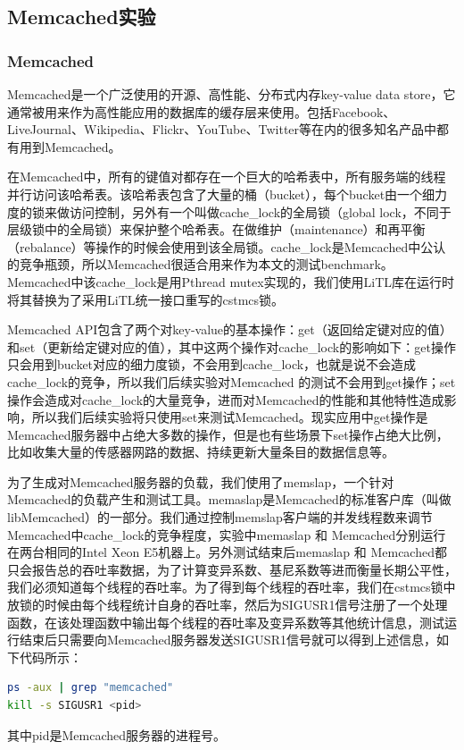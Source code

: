 \subsection{Memcached实验}
\subsubsection{Memcached}
Memcached是一个广泛使用的开源、高性能、分布式内存key-value data store，它通常被用来作为高性能应用的数据库的缓存层来使用。包括Facebook、LiveJournal、Wikipedia、Flickr、YouTube、Twitter等在内的很多知名产品中都有用到Memcached。

在Memcached中，所有的键值对都存在一个巨大的哈希表中，所有服务端的线程并行访问该哈希表。该哈希表包含了大量的桶（bucket），每个bucket由一个细力度的锁来做访问控制，另外有一个叫做cache\_lock的全局锁（global lock，不同于层级锁中的全局锁）来保护整个哈希表。在做维护（maintenance）和再平衡（rebalance）等操作的时候会使用到该全局锁。cache\_lock是Memcached中公认的竞争瓶颈\cite{pohlack2011lightweight}，所以Memcached很适合用来作为本文的测试benchmark。Memcached中该cache\_lock是用Pthread mutex实现的，我们使用LiTL库在运行时将其替换为了采用LiTL统一接口重写的cstmcs锁。

Memcached API包含了两个对key-value的基本操作：get（返回给定键对应的值）和set（更新给定键对应的值），其中这两个操作对cache\_lock的影响如下：get操作只会用到bucket对应的细力度锁，不会用到cache\_lock，也就是说不会造成cache\_lock的竞争，所以我们后续实验对Memcached 的测试不会用到get操作；set操作会造成对cache\_lock的大量竞争，进而对Memcached的性能和其他特性造成影响，所以我们后续实验将只使用set来测试Memcached。现实应用中get操作是Memcached服务器中占绝大多数的操作，但是也有些场景下set操作占绝大比例，比如收集大量的传感器网路的数据、持续更新大量条目的数据信息等\cite{dice2012lock}。

为了生成对Memcached服务器的负载，我们使用了memslap，一个针对Memcached的负载产生和测试工具。memaslap是Memcached的标准客户库（叫做libMemcached\cite{libmemcached}）的一部分。我们通过控制memslap客户端的并发线程数来调节Memcached中cache\_lock的竞争程度，实验中memaslap 和 Memcached分别运行在两台相同的Intel Xeon E5机器上。另外测试结束后memaslap 和 Memcached都只会报告总的吞吐率数据，为了计算变异系数、基尼系数等进而衡量长期公平性，我们必须知道每个线程的吞吐率。为了得到每个线程的吞吐率，我们在cstmcs锁中放锁的时候由每个线程统计自身的吞吐率，然后为SIGUSR1信号注册了一个处理函数，在该处理函数中输出每个线程的吞吐率及变异系数等其他统计信息，测试运行结束后只需要向Memcached服务器发送SIGUSR1信号就可以得到上述信息，如下代码所示：
\begin{lstlisting}[language={Bash}, caption={获取Memcached每个线程的吞吐率及其他统计信息}]
ps -aux | grep "memcached"
kill -s SIGUSR1 <pid>
\end{lstlisting}
其中pid是Memcached服务器的进程号。

